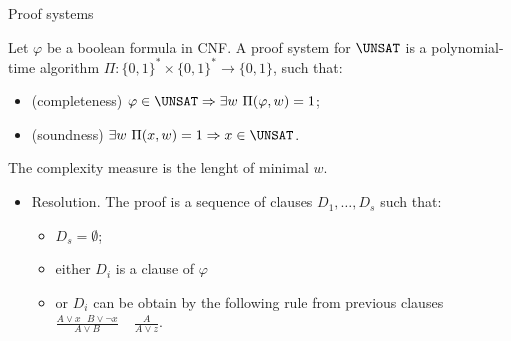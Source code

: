 \begin{frame}{Proof systems}

    \begin{definition}
        Let $\varphi$ be a boolean formula in CNF. A proof system for $\UNSAT$ is a polynomial-time algorithm $\Pi: \{0,
        1\}^* \times \{0, 1\}^* \rightarrow \{0, 1\}$, such that: 
        \begin{itemize}
            \item (completeness) $\varphi \in \UNSAT \Rightarrow \exists w ~ \Pi(\varphi, w) = 1$;
            \item (soundness) $\exists w ~ \Pi(x, w) = 1 \Rightarrow x \in \UNSAT$.
        \end{itemize}
    \end{definition}

    The complexity measure is the lenght of minimal $w$.
    \pause

    \vspace{0.3cm}

    \begin{itemize}
        \item Resolution. The proof is a sequence of clauses $D_1, \dots, D_s$ such that:
            \begin{itemize}
                \item $D_s = \emptyset$;
                \item either $D_i$ is a clause of $\varphi$
                \item or $D_i$ can be obtain by the following rule from previous clauses $\frac{A \lor x ~~~ B \lor \neg x}{A
                    \lor B} ~~~~~ \frac{A}{A \lor z}$.
            \end{itemize}
    \end{itemize}
\end{frame}

